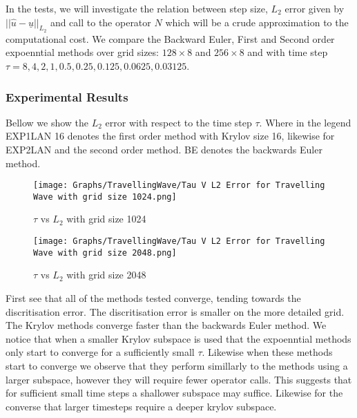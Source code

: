 In the tests, we will investigate the relation between step size, $L_2$ error given by $||\hat u - \underline{u}||_{L_2}$ and call to the operator $N$ which will be a crude approximation to the computational cost.
We compare the Backward Euler, First and Second order expoenntial methods over grid sizes: $128 \times 8$ and $256 \times 8$ and with time step $\tau=8,4,2,1,0.5,0.25,0.125,0.0625,0.03125$.

\subsubsection{Experimental Results}

Bellow we show the $L_2$ error with respect to the time step $\tau$.
Where in the legend EXP1LAN 16 denotes the first order method with Krylov size 16, likewise for EXP2LAN and the second order method.
BE denotes the backwards Euler method.

\begin{figure}[H]
    \centering
    \begin{minipage}{0.49\textwidth}
        \texttt{[image: Graphs/TravellingWave/Tau V L2 Error for Travelling Wave with grid size 1024.png]} %
        \caption{$\tau$ vs $L_2$ with grid size 1024}
        \label{fig:plot1}
    \end{minipage}\hfill
    \centering
    \begin{minipage}{0.49\textwidth}
        \texttt{[image: Graphs/TravellingWave/Tau V L2 Error for Travelling Wave with grid size 2048.png]} %
        \caption{$\tau$ vs $L_2$ with grid size 2048}
        \label{fig:plot2}
    \end{minipage}\hfill
\end{figure}

First see that all of the methods tested converge, tending towards the discritisation error.
The discritisation error is smaller on the more detailed grid.
The Krylov methods converge faster than the backwards Euler method.
We notice that when a smaller Krylov subspace is used that the expoenntial methods only start to converge for a sufficiently small $\tau$.
Likewise when these methods start to converge we observe that they perform simillarly to the methods using a larger subspace, however they will require fewer operator calls.
This suggests that for sufficient small time steps a shallower subspace may suffice.
Likewise for the converse that larger timesteps require a deeper krylov subspace.

